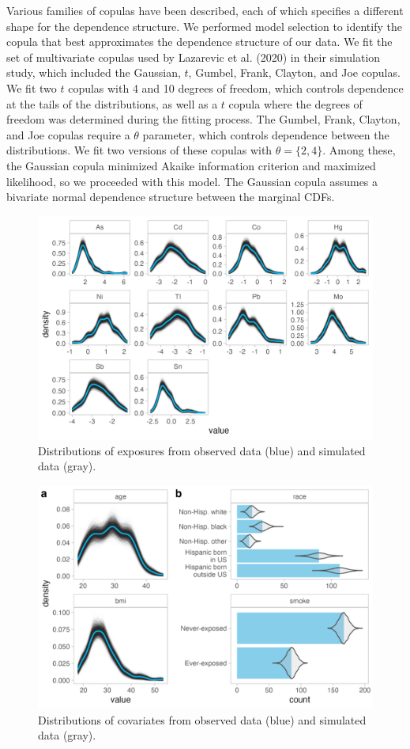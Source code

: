 \documentclass[12pt, twoside]{amherstthesis}
\begin{document}
Various families of copulas have been described, each of which specifies a different shape for the dependence structure. We performed model selection to identify the copula that best approximates the dependence structure of our data. We fit the set of multivariate copulas used by Lazarevic et al. (2020) in their simulation study, which included the Gaussian, \(t\), Gumbel, Frank, Clayton, and Joe copulas. We fit two \(t\) copulas with 4 and 10 degrees of freedom, which controls dependence at the tails of the distributions, as well as a \(t\) copula where the degrees of freedom was determined during the fitting process. The Gumbel, Frank, Clayton, and Joe copulas require a \(\theta\) parameter, which controls dependence between the distributions. We fit two versions of these copulas with \(\theta=\{2, 4\}\). Among these, the Gaussian copula minimized Akaike information criterion and maximized likelihood, so we proceeded with this model. The Gaussian copula assumes a bivariate normal dependence structure between the marginal CDFs.
\begin{figure}

{\centering \includegraphics[width=0.75\linewidth]{figures/ch4_univ_exp_sim} 

}

\caption{Distributions of exposures from observed data (blue) and simulated data (gray).}\label{fig:univexpsim}
\end{figure}
\begin{figure}

{\centering \includegraphics[width=0.75\linewidth]{figures/ch4_univ_cov_sim} 

}

\caption{Distributions of covariates from observed data (blue) and simulated data (gray).}\label{fig:univcovsim}
\end{figure}
\end{document}
